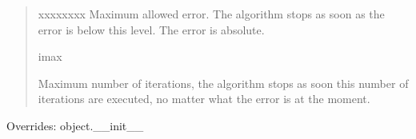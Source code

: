 \begin{boxedminipage}{\funcwidth}
\begin{quote}
\begin{Ventry}{xxxxxxxx}
Maximum allowed error. The algorithm stops as soon as the error is
below this level. The error is absolute.
          \item[imax]


Maximum number of iterations, the algorithm stops as soon this
number of iterations are executed, no matter what the error is at
the moment.
        \end{Ventry}

      \end{quote}

      Overrides: object.\_\_init\_\_

    \end{boxedminipage}

    \label{peach:sa:base:BinarySA:restart}

    \vspace{0.5ex}

